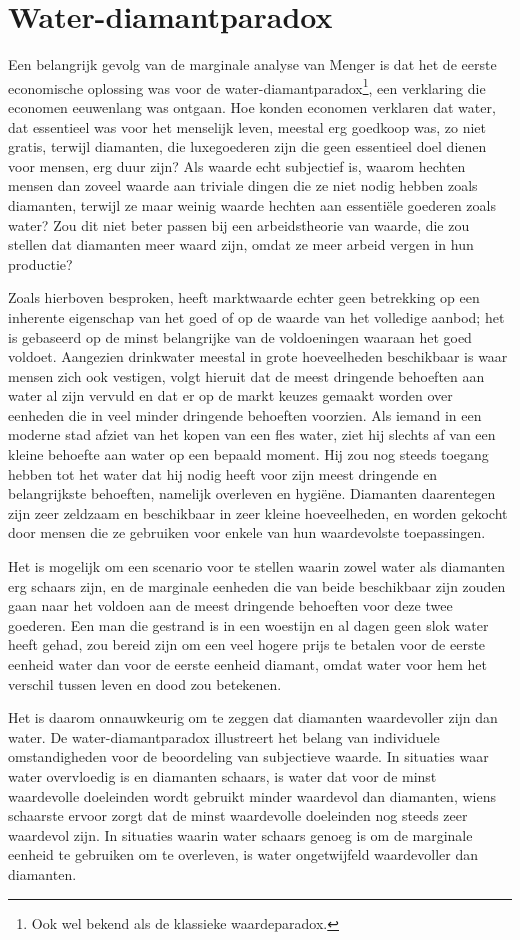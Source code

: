 \section{Water-diamantparadox}

Een belangrijk gevolg van de marginale analyse van Menger is dat het de eerste economische oplossing was voor de water-diamantparadox\footnote{Ook wel bekend als de klassieke waardeparadox.}, een verklaring die economen eeuwenlang was ontgaan. Hoe konden economen verklaren dat water, dat essentieel was voor het menselijk leven, meestal erg goedkoop was, zo niet gratis, terwijl diamanten, die luxegoederen zijn die geen essentieel doel dienen voor mensen, erg duur zijn? Als waarde echt subjectief is, waarom hechten mensen dan zoveel waarde aan triviale dingen die ze niet nodig hebben zoals diamanten, terwijl ze maar weinig waarde hechten aan essentiële goederen zoals water? Zou dit niet beter passen bij een arbeidstheorie van waarde, die zou stellen dat diamanten meer waard zijn, omdat ze meer arbeid vergen in hun productie?

Zoals hierboven besproken, heeft marktwaarde echter geen betrekking op een inherente eigenschap van het goed of op de waarde van het volledige aanbod; het is gebaseerd op de minst belangrijke van de voldoeningen waaraan het goed voldoet. Aangezien drinkwater meestal in grote hoeveelheden beschikbaar is waar mensen zich ook vestigen, volgt hieruit dat de meest dringende behoeften aan water al zijn vervuld en dat er op de markt keuzes gemaakt worden over eenheden die in veel minder dringende behoeften voorzien. Als iemand in een moderne stad afziet van het kopen van een fles water, ziet hij slechts af van een kleine behoefte aan water op een bepaald moment. Hij zou nog steeds toegang hebben tot het water dat hij nodig heeft voor zijn meest dringende en belangrijkste behoeften, namelijk overleven en hygiëne. Diamanten daarentegen zijn zeer zeldzaam en beschikbaar in zeer kleine hoeveelheden, en worden gekocht door mensen die ze gebruiken voor enkele van hun waardevolste toepassingen.

Het is mogelijk om een scenario voor te stellen waarin zowel water als diamanten erg schaars zijn, en de marginale eenheden die van beide beschikbaar zijn zouden gaan naar het voldoen aan de meest dringende behoeften voor deze twee goederen. Een man die gestrand is in een woestijn en al dagen geen slok water heeft gehad, zou bereid zijn om een veel hogere prijs te betalen voor de eerste eenheid water dan voor de eerste eenheid diamant, omdat water voor hem het verschil tussen leven en dood zou betekenen.

Het is daarom onnauwkeurig om te zeggen dat diamanten waardevoller zijn dan water. De water-diamantparadox illustreert het belang van individuele omstandigheden voor de beoordeling van subjectieve waarde. In situaties waar water overvloedig is en diamanten schaars, is water dat voor de minst waardevolle doeleinden wordt gebruikt minder waardevol dan diamanten, wiens schaarste ervoor zorgt dat de minst waardevolle doeleinden nog steeds zeer waardevol zijn. In situaties waarin water schaars genoeg is om de marginale eenheid te gebruiken om te overleven, is water ongetwijfeld waardevoller dan diamanten.
